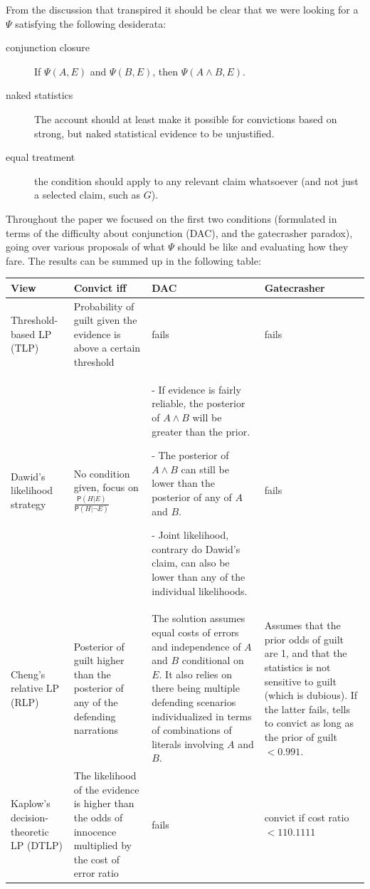 \documentclass[10pt,dvipsnames,enabledeprecatedfontcommands]{scrartcl}
\newcommand{\n}{\neg}
\newcommand{\et}{\wedge}
\newcommand{\pr}[1]{\mathsf{P}(#1)}
\begin{document}
From the discussion that transpired it should be clear that we were
looking for a \(\Psi\) satisfying the following desiderata:

\begin{description}
\item[conjunction closure] If $\Psi(A,E)$ and $\Psi(B,E)$, then $\Psi(A\et B,E)$.
\item[naked statistics] The account should at least make it possible for convictions based on strong, but naked statistical evidence to be unjustified. 
\item[equal treatment] the condition should apply to any relevant claim whatsoever (and not just a selected claim, such as $G$).
\end{description}

Throughout the paper we focused on the first two conditions (formulated
in terms of the difficulty about conjunction (DAC), and the gatecrasher
paradox), going over various proposals of what \(\Psi\) should be like
and evaluating how they fare. The results can be summed up in the
following table:

\begin{center}
\footnotesize 
 \begin{tabular}{@{}p{3cm}p{2.5cm}p{4cm}p{3cm}@{}}
\toprule
\textbf{View} & \textbf{Convict iff} & \textbf{DAC} & \textbf{Gatecrasher} \\ \midrule
Threshold-based LP (TLP) & Probability of guilt given the evidence is above a certain threshold & fails & fails \\
Dawid's likelihood strategy & No condition given, focus on $\frac{\pr{H\vert E}}{\pr{H\vert \n E}}$ & - If evidence is fairly reliable, the posterior of $A\et B$ will be greater than the prior.

- The posterior of $A\et B$ can still be lower than the posterior of any of $A$ and $B$.

- Joint likelihood, contrary do Dawid's claim, can also be lower than any of the individual likelihoods. & fails  \\
Cheng's relative LP (RLP)
& Posterior of guilt higher than the posterior of any of the defending narrations & The solution assumes equal costs of errors and independence of $A$ and $B$ conditional on $E$. It also relies on there being multiple defending scenarios individualized in terms of  combinations of literals involving $A$ and $B$. & Assumes that the prior odds of guilt are 1, and that the statistics is not sensitive to guilt (which is dubious). If the latter fails, tells to convict as long as the prior of guilt $<0.991$. \\
Kaplow's decision-theoretic LP (DTLP) &
The likelihood of the evidence is higher than the odds of innocence multiplied by the cost of error ratio & fails & convict if cost ratio $<110.1111$
\end{tabular} 
 \end{center}
\end{document}
